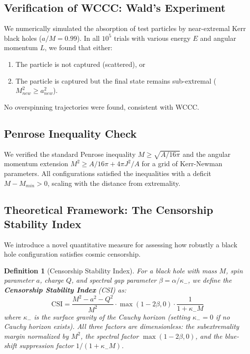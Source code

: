 \documentclass[12pt,a4paper]{article}
\newtheorem{definition}[theorem]{Definition}
\begin{document}
\subsection{Verification of WCCC: Wald's Experiment}
We numerically simulated the absorption of test particles by near-extremal Kerr black holes ($a/M = 0.99$). In all $10^5$ trials with various energy $E$ and angular momentum $L$, we found that either:
\begin{enumerate}
    \item The particle is not captured (scattered), or
    \item The particle is captured but the final state remains sub-extremal ($M_{new}^2 \geq a_{new}^2$).
\end{enumerate}
No overspinning trajectories were found, consistent with WCCC.

\subsection{Penrose Inequality Check}
We verified the standard Penrose inequality $M \geq \sqrt{A/16\pi}$ and the angular momentum extension $M^2 \geq A/16\pi + 4\pi J^2/A$ for a grid of Kerr-Newman parameters. All configurations satisfied the inequalities with a deficit $M - M_{min} > 0$, scaling with the distance from extremality.


\subsection{Theoretical Framework: The Censorship Stability Index}

We introduce a novel quantitative measure for assessing how robustly a black hole configuration satisfies cosmic censorship.

\begin{definition}[Censorship Stability Index]
For a black hole with mass $M$, spin parameter $a$, charge $Q$, and spectral gap parameter $\beta = \alpha/\kappa_-$, we define the \textbf{Censorship Stability Index} (CSI) as:
\begin{equation}
\text{CSI} = \frac{M^2 - a^2 - Q^2}{M^2} \cdot \max(1 - 2\beta, 0) \cdot \frac{1}{1 + \kappa_- M}
\end{equation}
where $\kappa_-$ is the surface gravity of the Cauchy horizon (setting $\kappa_- = 0$ if no Cauchy horizon exists). All three factors are dimensionless: the subextremality margin normalized by $M^2$, the spectral factor $\max(1-2\beta,0)$, and the blue-shift suppression factor $1/(1 + \kappa_- M)$.
\end{definition}
\end{document}
